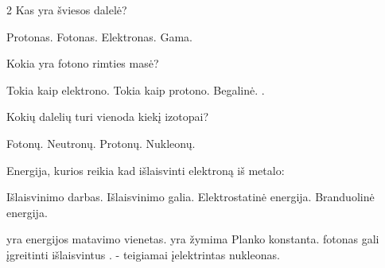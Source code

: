 \documentclass{exam}
\begin{document}
	\begin{center}
	\end{center}
	
	\vspace{5mm}

	\begin{questions}
	\raggedcolumns\begin{multicols}             {2} 
\question Kas yra šviesos dalelė? \begin{choices}
	\choice Protonas.
	\choice Fotonas.
	\choice Elektronas.
	\choice Gama.
\end{choices}
\question Kokia yra fotono rimties masė? \begin{choices}
    \choice Tokia kaip elektrono.
    \choice Tokia kaip protono.
    \choice Begalinė.
    .
\end{choices}
\question Kokių dalelių turi vienoda kiekį izotopai? \begin{choices}
    \choice Fotonų.
    \choice Neutronų.
    \choice Protonų.
    \choice Nukleonų.
\end{choices}
\question Energija, kurios reikia kad išlaisvinti elektroną iš metalo: \begin{choices}
    \choice Išlaisvinimo darbas.
    \choice Išlaisvinimo galia.
    \choice Elektrostatinė energija.
    \choice Branduolinė energija.
\end{choices}
\end{multicols} 

	\question \fillin[J] yra energijos matavimo vienetas.
\question \fillin[h] yra žymima Planko konstanta.
\question fotonas gali įgreitinti išlaisvintus \fillin[elektronus].
\question \fillin[protonas] - teigiamai įelektrintas nukleonas.

	\end{questions}
	
\end{document}
